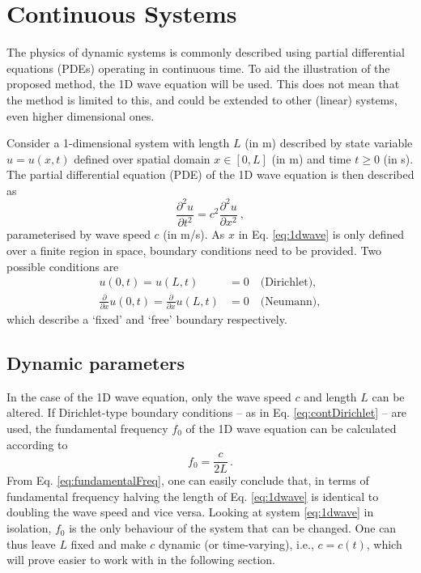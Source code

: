 \documentclass[dvipsnames, reprint]{JASA}
\def\SWcomment[#1]{\textcolor{Bittersweet}{#1}}
\begin{document}
\section{Continuous Systems}\label{sec:continuous}
%
%
%
The physics of dynamic systems is commonly described using partial differential equations (PDEs) operating in continuous time. To aid the illustration of the proposed method, the 1D wave equation will be used. \SWcomment[This does not mean that the method is limited to this, and could be extended to other (linear) systems, even higher dimensional ones.]

Consider a 1-dimensional system with length $L$ (in m) described by state variable $u = u(x, t)$ defined over spatial domain $x \in [0, L]$ (in m) and time $t \geq 0$ (in s). The partial differential equation (PDE) of the 1D wave equation is then described as
\begin{equation}\label{eq:1dwave}
    \frac{\partial^2 u}{\partial t^2}= c^2\frac{\partial^2 u}{\partial x^2}\ ,
\end{equation}
parameterised by wave speed $c$ (in m/s). As $x$ in Eq. \eqref{eq:1dwave} is only defined over a finite region in space, boundary conditions need to be provided. Two possible conditions are
\begin{subequations}\label{eq:continuousBoundaries}
    \begin{align}
        u(0, t) = u(L, t) &= 0\quad \text{(Dirichlet)},\label{eq:contDirichlet}\\
        \frac{\partial}{\partial x} u(0, t) = \frac{\partial}{\partial x} u(L, t) &= 0\quad \text{(Neumann)},\label{eq:contNeumann}
    \end{align}
\end{subequations}
which describe a `fixed' and `free' boundary respectively.

\subsection{Dynamic parameters}
In the case of the 1D wave equation, only the wave speed $c$ and length $L$ can be altered. If Dirichlet-type boundary conditions -- as in Eq. \eqref{eq:contDirichlet} -- are used, the fundamental frequency $f_0$ of the 1D wave equation can be calculated according to
\begin{equation}\label{eq:fundamentalFreq}
    f_0 = \frac{c}{2L}\,.
\end{equation}
From Eq. \eqref{eq:fundamentalFreq}, one can easily conclude that, in terms of fundamental frequency halving the length of Eq. \eqref{eq:1dwave} is identical to doubling the wave speed and vice versa. Looking at system \eqref{eq:1dwave} in isolation, $f_0$ is the only behaviour of the system that can be changed. One can thus leave $L$ fixed %
and make $c$ dynamic (or time-varying), i.e., $c = c(t)$, which will prove easier to work with in the following section.
\end{document}
